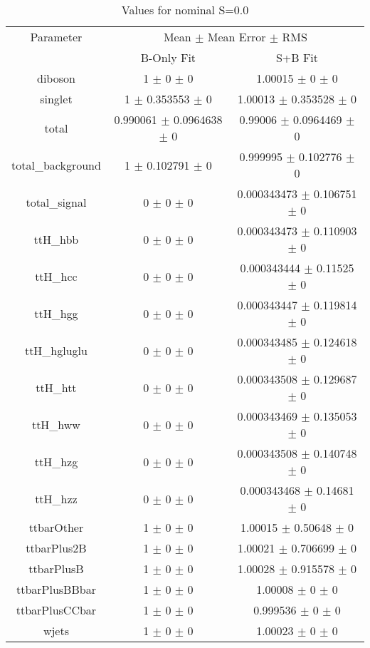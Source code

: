 \begin{table}
\centering
\caption{Values for nominal S=0.0}
\begin{tabular}{ccc}
\toprule
Parameter & \multicolumn{2}{c}{Mean $\pm$ Mean Error $\pm$ RMS}\\
 & B-Only Fit & S+B Fit\\
\midrule
diboson & \num{1} $\pm$ \num{0} $\pm$ \num{0} & \num{1.00015} $\pm$ \num{0} $\pm$ \num{0}\\
singlet & \num{1} $\pm$ \num{0.353553} $\pm$ \num{0} & \num{1.00013} $\pm$ \num{0.353528} $\pm$ \num{0}\\
total & \num{0.990061} $\pm$ \num{0.0964638} $\pm$ \num{0} & \num{0.99006} $\pm$ \num{0.0964469} $\pm$ \num{0}\\
total\_background & \num{1} $\pm$ \num{0.102791} $\pm$ \num{0} & \num{0.999995} $\pm$ \num{0.102776} $\pm$ \num{0}\\
total\_signal & \num{0} $\pm$ \num{0} $\pm$ \num{0} & \num{0.000343473} $\pm$ \num{0.106751} $\pm$ \num{0}\\
ttH\_hbb & \num{0} $\pm$ \num{0} $\pm$ \num{0} & \num{0.000343473} $\pm$ \num{0.110903} $\pm$ \num{0}\\
ttH\_hcc & \num{0} $\pm$ \num{0} $\pm$ \num{0} & \num{0.000343444} $\pm$ \num{0.11525} $\pm$ \num{0}\\
ttH\_hgg & \num{0} $\pm$ \num{0} $\pm$ \num{0} & \num{0.000343447} $\pm$ \num{0.119814} $\pm$ \num{0}\\
ttH\_hgluglu & \num{0} $\pm$ \num{0} $\pm$ \num{0} & \num{0.000343485} $\pm$ \num{0.124618} $\pm$ \num{0}\\
ttH\_htt & \num{0} $\pm$ \num{0} $\pm$ \num{0} & \num{0.000343508} $\pm$ \num{0.129687} $\pm$ \num{0}\\
ttH\_hww & \num{0} $\pm$ \num{0} $\pm$ \num{0} & \num{0.000343469} $\pm$ \num{0.135053} $\pm$ \num{0}\\
ttH\_hzg & \num{0} $\pm$ \num{0} $\pm$ \num{0} & \num{0.000343508} $\pm$ \num{0.140748} $\pm$ \num{0}\\
ttH\_hzz & \num{0} $\pm$ \num{0} $\pm$ \num{0} & \num{0.000343468} $\pm$ \num{0.14681} $\pm$ \num{0}\\
ttbarOther & \num{1} $\pm$ \num{0} $\pm$ \num{0} & \num{1.00015} $\pm$ \num{0.50648} $\pm$ \num{0}\\
ttbarPlus2B & \num{1} $\pm$ \num{0} $\pm$ \num{0} & \num{1.00021} $\pm$ \num{0.706699} $\pm$ \num{0}\\
ttbarPlusB & \num{1} $\pm$ \num{0} $\pm$ \num{0} & \num{1.00028} $\pm$ \num{0.915578} $\pm$ \num{0}\\
ttbarPlusBBbar & \num{1} $\pm$ \num{0} $\pm$ \num{0} & \num{1.00008} $\pm$ \num{0} $\pm$ \num{0}\\
ttbarPlusCCbar & \num{1} $\pm$ \num{0} $\pm$ \num{0} & \num{0.999536} $\pm$ \num{0} $\pm$ \num{0}\\
wjets & \num{1} $\pm$ \num{0} $\pm$ \num{0} & \num{1.00023} $\pm$ \num{0} $\pm$ \num{0}\\
\bottomrule
\end{tabular}
\end{table}